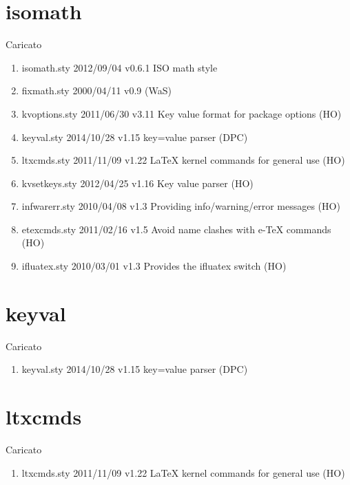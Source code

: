 \section{isomath}	 	 

Caricato 
\begin{enumerate}
\item isomath.sty 2012/09/04 v0.6.1 ISO math style
\item fixmath.sty 2000/04/11 v0.9 (WaS)
\item kvoptions.sty 2011/06/30 v3.11 Key value format for package options (HO)
\item keyval.sty 2014/10/28 v1.15 key=value parser (DPC)
\item ltxcmds.sty 2011/11/09 v1.22 LaTeX kernel commands for general use (HO)
\item kvsetkeys.sty 2012/04/25 v1.16 Key value parser (HO)
\item infwarerr.sty 2010/04/08 v1.3 Providing info/warning/error messages (HO)
\item etexcmds.sty 2011/02/16 v1.5 Avoid name clashes with e-TeX commands (HO)
\item ifluatex.sty 2010/03/01 v1.3 Provides the ifluatex switch (HO)
\end{enumerate}	
\section{keyval}	 	 

Caricato 
\begin{enumerate}
\item keyval.sty 2014/10/28 v1.15 key=value parser (DPC)
\end{enumerate}
\section{ltxcmds}	 	 

Caricato 
\begin{enumerate}
\item ltxcmds.sty 2011/11/09 v1.22 LaTeX kernel commands for general use (HO)
\end{enumerate}
